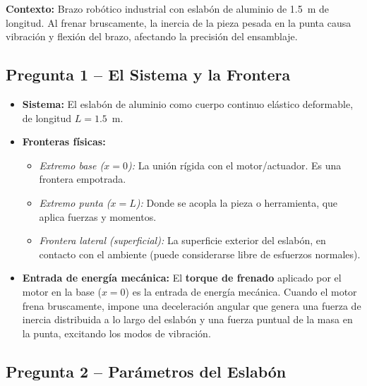 \documentclass[12pt,a4paper]{article}
\begin{document}
\noindent\textbf{Contexto:} Brazo robótico industrial con eslabón de aluminio de 1.5~m de
longitud. Al frenar bruscamente, la inercia de la pieza pesada en la punta causa vibración y
flexión del brazo, afectando la precisión del ensamblaje.

\subsection*{Pregunta 1 -- El Sistema y la Frontera}

\begin{itemize}
    \item \textbf{Sistema:} El eslabón de aluminio como cuerpo continuo elástico deformable, de
          longitud $L = 1.5$~m.
    \item \textbf{Fronteras físicas:}
          \begin{itemize}
              \item \textit{Extremo base ($x = 0$):} La unión rígida con el motor/actuador. Es
                    una frontera empotrada.
              \item \textit{Extremo punta ($x = L$):} Donde se acopla la pieza o herramienta,
                    que aplica fuerzas y momentos.
              \item \textit{Frontera lateral (superficial):} La superficie exterior del eslabón,
                    en contacto con el ambiente (puede considerarse libre de esfuerzos normales).
          \end{itemize}
    \item \textbf{Entrada de energía mecánica:} El \textbf{torque de frenado} aplicado por el
          motor en la base ($x = 0$) es la entrada de energía mecánica. Cuando el motor frena
          bruscamente, impone una deceleración angular que genera una fuerza de inercia distribuida
          a lo largo del eslabón y una fuerza puntual de la masa en la punta, excitando los modos
          de vibración.
\end{itemize}

\subsection*{Pregunta 2 -- Parámetros del Eslabón}
\end{document}
